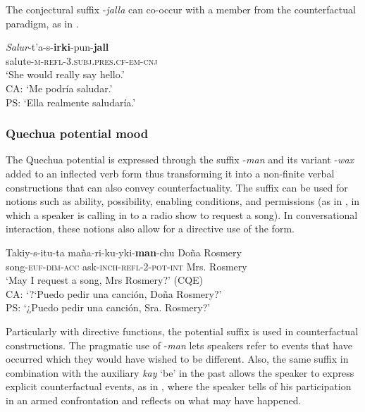 \documentclass[output=paper,hidelinks]{langscibook}
\begin{document}
\z

The conjectural suffix -\textit{jalla} can co-occur with a member from the counterfactual paradigm, as in .

\ea \label{ex:saludar}
\gll \textit{Salur}-t'a-s-\textbf{irki}-pun-\textbf{jall} \\
salute-\textsc{m-refl-3.subj.pres.cf-em-cnj} \\ 
\glt ‘She would really say hello.’\citep[517]{coler2014grammar} \\
CA: `Me podría saludar.' \\
PS: `Ella realmente saludaría.'
\z 

\subsubsection{Quechua potential mood}
The Quechua potential is expressed through the suffix -\textit{man} and its variant -\textit{wax} added to an inflected verb form thus transforming it into a non-finite verbal constructions that can also convey counterfactuality. The suffix can be used for notions such as ability, possibility, enabling conditions, %
and permissions (as in , in which a speaker is calling in to a radio show to request a song). In conversational interaction, these notions also allow for a directive use of the form.

\ea \label{ex:QPot1}
\gll Takiy-s-itu-ta maña-ri-ku-yki-\textbf{man}-chu Doña Rosmery \\
  song-\textsc{euf-dim-acc} ask-\textsc{inch-refl-2-pot-int} Mrs. Rosmery\\ 
  \glt ‘May I request a song, Mrs Rosmery?’ (CQE) \\
CA: `?`Puedo pedir una canción, Doña Rosmery?'\\
PS: `¿Puedo pedir una canción, Sra. Rosmery?'
\z 

Particularly with directive functions, the potential suffix is used in counterfactual constructions. The pragmatic use of -\textit{man} lets speakers refer to events that have occurred which they would have wished to be different. Also, the same suffix in combination with the auxiliary \textit{kay} `be' in the past allows the speaker to express explicit counterfactual events, as in , where the speaker tells of his participation in an armed confrontation and reflects on what may have happened.
\end{document}
